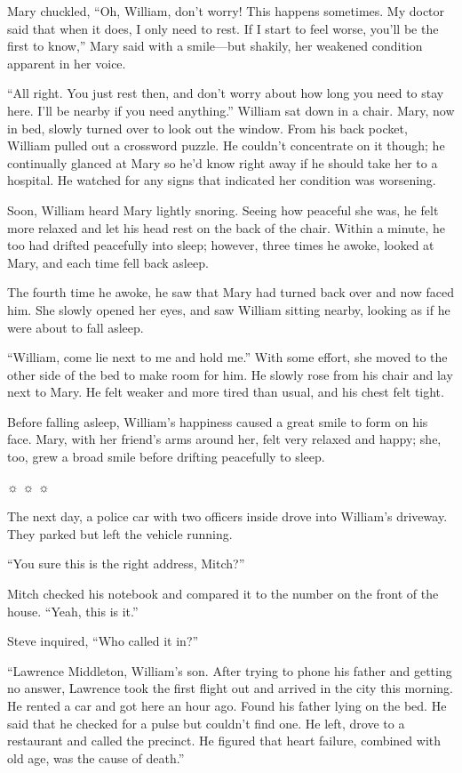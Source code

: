 Mary chuckled, “Oh, William, don't worry! This happens sometimes. My doctor said that when it does, I only need to rest. If I start to feel worse, you'll be the first to know,” Mary said with a smile—but shakily, her weakened condition apparent in her voice.

“All right. You just rest then, and don't worry about how long you need to stay here. I'll be nearby if you need anything.” William sat down in a chair. Mary, now in bed, slowly turned over to look out the window. From his back pocket, William pulled out a crossword puzzle. He couldn't concentrate on it though; he continually glanced at Mary so he'd know right away if he should take her to a hospital. He watched for any signs that indicated her condition was worsening.

Soon, William heard Mary lightly snoring. Seeing how peaceful she was, he felt more relaxed and let his head rest on the back of the chair. Within a minute, he too had drifted peacefully into sleep; however, three times he awoke, looked at Mary, and each time fell back asleep.

The fourth time he awoke, he saw that Mary had turned back over and now faced him. She slowly opened her eyes, and saw William sitting nearby, looking as if he were about to fall asleep.

“William, come lie next to me and hold me.” With some effort, she moved to the other side of the bed to make room for him. He slowly rose from his chair and lay next to Mary. He felt weaker and more tired than usual, and his chest felt tight.

Before falling asleep, William's happiness caused a great smile to form on his face. Mary, with her friend's arms around her, felt very relaxed and happy; she, too, grew a broad smile before drifting peacefully to sleep.



☼ ☼ ☼





The next day, a police car with two officers inside drove into William's driveway. They parked but left the vehicle running.

“You sure this is the right address, Mitch?”

Mitch checked his notebook and compared it to the number on the front of the house. “Yeah, this is it.”

Steve inquired, “Who called it in?”

“Lawrence Middleton, William's son. After trying to phone his father and getting no answer, Lawrence took the first flight out and arrived in the city this morning. He rented a car and got here an hour ago. Found his father lying on the bed. He said that he checked for a pulse but couldn't find one. He left, drove to a restaurant and called the precinct. He figured that heart failure, combined with old age, was the cause of death.”

